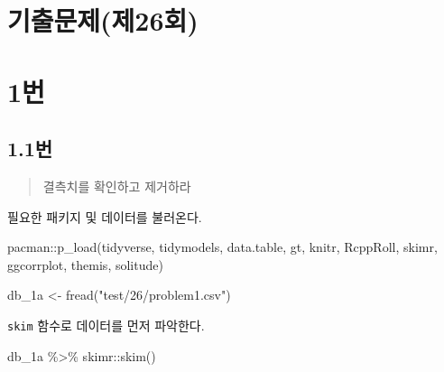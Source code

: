 \documentclass[
  letterpaper,
  DIV=11,
  numbers=noendperiod]{scrreprt}
\newenvironment{Shaded}{\begin{snugshade}}{\end{snugshade}}
\newcommand{\FunctionTok}[1]{\textcolor[rgb]{0.28,0.35,0.67}{#1}}
\newcommand{\NormalTok}[1]{\textcolor[rgb]{0.00,0.23,0.31}{#1}}
\newcommand{\OtherTok}[1]{\textcolor[rgb]{0.00,0.23,0.31}{#1}}
\newcommand{\SpecialCharTok}[1]{\textcolor[rgb]{0.37,0.37,0.37}{#1}}
\newcommand{\StringTok}[1]{\textcolor[rgb]{0.13,0.47,0.30}{#1}}
\begin{document}
\hypertarget{uxae30uxcd9cuxbb38uxc81cuxc81c26uxd68c}{%
\chapter*{기출문제(제26회)}\label{uxae30uxcd9cuxbb38uxc81cuxc81c26uxd68c}}


\hypertarget{uxbc88-17}{%
\chapter*{1번}\label{uxbc88-17}}


\hypertarget{uxbc88-18}{%
\section*{1.1번}\label{uxbc88-18}}


\begin{quote}
결측치를 확인하고 제거하라
\end{quote}

필요한 패키지 및 데이터를 불러온다.

\begin{Shaded}
\begin{Highlighting}[]
\NormalTok{pacman}\SpecialCharTok{::}\FunctionTok{p\_load}\NormalTok{(tidyverse, tidymodels, data.table, gt, knitr, RcppRoll,}
\NormalTok{               skimr, ggcorrplot, themis, solitude)}

\NormalTok{db\_1a }\OtherTok{\textless{}{-}} \FunctionTok{fread}\NormalTok{(}\StringTok{"test/26/problem1.csv"}\NormalTok{) }
\end{Highlighting}
\end{Shaded}

\texttt{skim} 함수로 데이터를 먼저 파악한다.

\begin{Shaded}
\begin{Highlighting}[]
\NormalTok{db\_1a }\SpecialCharTok{\%\textgreater{}\%}\NormalTok{ skimr}\SpecialCharTok{::}\FunctionTok{skim}\NormalTok{()}
\end{Highlighting}
\end{Shaded}
\end{document}

